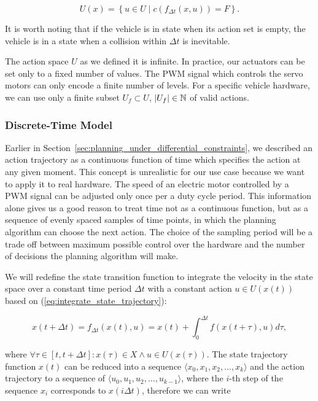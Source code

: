 \[
U(x)=\left\{u\in U \mid c(f_{\Delta t}(x, u)) = F\right\}.
\]

It is worth noting that if the vehicle is in state when its action set is empty, the vehicle is in a state when a collision within $\Delta t$ is inevitable.

The action space $U$ as we defined it is infinite. In practice, our actuators can be set only to a fixed number of values. The \gls*{PWM} signal which controls the servo motors can only encode a finite number of levels. For a specific vehicle hardware, we can use only a finite subset $U_f\subset U$, $\left|{U_f}\right|\in\mathbb{N}$ of valid actions.

\subsubsection{Discrete-Time Model}

Earlier in Section~\ref{sec:planning_under_differential_constraints}, we described an action trajectory as a continuous function of time which specifies the action at any given moment. This concept is unrealistic for our use case because we want to apply it to real hardware. The speed of an electric motor controlled by a \gls{PWM} signal can be adjusted only once per a duty cycle period. This information alone gives us a good reason to treat time not as a continuous function, but as a sequence of evenly spaced samples of time points, in which the planning algorithm can choose the next action. The choice of the sampling period will be a trade off between maximum possible control over the hardware and the number of decisions the planning algorithm will make.

We will redefine the state transition function to integrate the velocity in the state space over a constant time period $\Delta t$ with a constant action $u\in U(x(t))$ based on (\ref{eq:integrate_state_trajectory}):

\begin{equation}
	x(t+\Delta t)=f_{\Delta t}(x(t), u)=x(t) + \int_{0}^{\Delta t} f\left(x(t+\tau), u \right) d\tau,
\end{equation}

where $\forall \tau \in [t, t+\Delta t]: x(\tau)\in X \wedge u\in U(x(\tau))$. The state trajectory function $x(t)$ can be reduced into a sequence $\langle x_0, x_1, x_2, \ldots, x_k\rangle$ and the action trajectory to a sequence of $\langle u_0, u_1, u_2, \ldots, u_{k-1}\rangle$, where the $i$-th step of the sequence $x_i$ corresponds to $x(i\Delta t)$, therefore we can write

